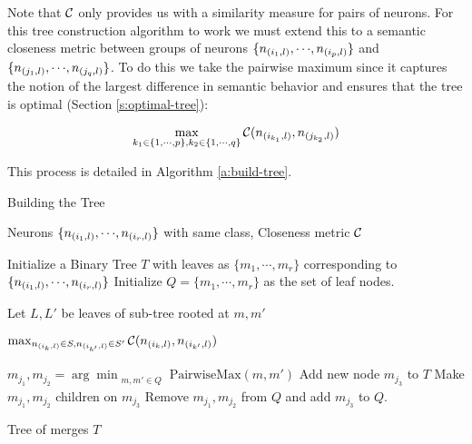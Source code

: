 Note that $\mathcal{C}$ only provides us
with a similarity measure for pairs of neurons. For this tree construction
algorithm to work we must extend this to a semantic closeness
metric between groups of neurons
$\{n_{(i_1,l)}, {\cdots}, n_{(i_p,l)}\}$ and $\{n_{(j_1,l)}, {\cdots},
n_{(j_q,l)}\}$. To do this we take the pairwise maximum since it captures the
notion of the largest difference in semantic behavior and ensures that the tree
is optimal (Section \ref{s:optimal-tree}): 

\begin{equation*}
\begin{aligned}
    \max_{k_1 \in \{1, {\cdots}, p\},
    k_2 \in \{1, {\cdots}, q\}} \mathcal{C}( n_{(i_{k_1},l)}, n_{(j_{k_2},l)} )
\end{aligned}
\end{equation*}


This process is detailed in Algorithm \ref{a:build-tree}.

\begin{algorithm}
\caption{Building the Tree}
\label{a:build-tree}
\begin{algorithmic}[1]

    \Require Neurons $\{n_{(i_1,l)}, {\cdots}, n_{(i_r,l)}\}$ with same class,
    Closeness metric $\mathcal{C}$

    
    \State Initialize a Binary Tree $T$ with leaves as
        $\{m_1, {\cdots}, m_r\}$ corresponding to $\{ n_{(i_1,l)}, {\cdots},
        n_{(i_r,l)} \}$
    \State Initialize $Q=\{m_1, {\cdots}, m_r\}$ as the set of leaf nodes.

        
            \State Let $L, L'$ be leaves of sub-tree rooted at $m, m'$

            \Return $\max_{n_{(i_{k},l)} \in S, n_{(i_{k'},l)} \in S'} 
                \mathcal{C}( n_{(i_{k},l)}, n_{(i_{k'},l)} )$

    \EndFunction

        \State $m_{j_1}, m_{j_2} = \arg\min_{\substack{m, m' \in Q}} 
            \text{PairwiseMax}(m, m')$
        \State Add new node $m_{j_3}$ to $T$ 
        \State Make $m_{j_1}, m_{j_2}$ children on $m_{j_3}$
        \State Remove $m_{j_1}, m_{j_2}$ from $Q$ and add $m_{j_3}$ to $Q$.
    \EndWhile

    \Ensure Tree of merges $T$
\end{algorithmic}
\end{algorithm}

